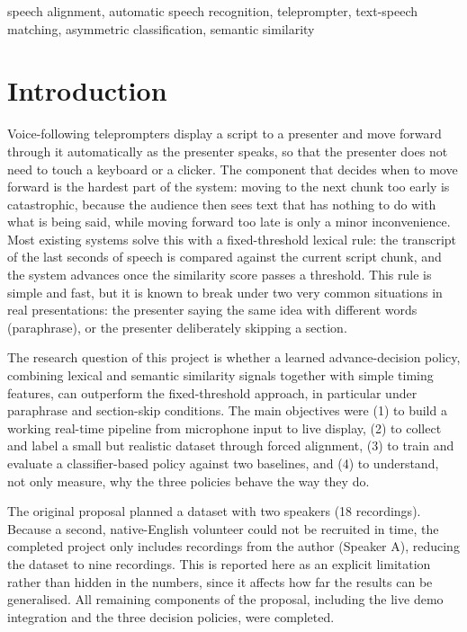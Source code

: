 \documentclass[conference,a4paper]{IEEEtran}
\begin{document}
\begin{IEEEkeywords}
speech alignment, automatic speech recognition, teleprompter, text-speech matching, asymmetric classification, semantic similarity
\end{IEEEkeywords}

\section{Introduction}
Voice-following teleprompters display a script to a presenter and move forward through it automatically as the presenter speaks, so that the presenter does not need to touch a keyboard or a clicker. The component that decides when to move forward is the hardest part of the system: moving to the next chunk too early is catastrophic, because the audience then sees text that has nothing to do with what is being said, while moving forward too late is only a minor inconvenience. Most existing systems solve this with a fixed-threshold lexical rule: the transcript of the last seconds of speech is compared against the current script chunk, and the system advances once the similarity score passes a threshold. This rule is simple and fast, but it is known to break under two very common situations in real presentations: the presenter saying the same idea with different words (paraphrase), or the presenter deliberately skipping a section.

The research question of this project is whether a learned advance-decision policy, combining lexical and semantic similarity signals together with simple timing features, can outperform the fixed-threshold approach, in particular under paraphrase and section-skip conditions. The main objectives were (1) to build a working real-time pipeline from microphone input to live display, (2) to collect and label a small but realistic dataset through forced alignment, (3) to train and evaluate a classifier-based policy against two baselines, and (4) to understand, not only measure, why the three policies behave the way they do.

The original proposal planned a dataset with two speakers (18 recordings). Because a second, native-English volunteer could not be recruited in time, the completed project only includes recordings from the author (Speaker A), reducing the dataset to nine recordings. This is reported here as an explicit limitation rather than hidden in the numbers, since it affects how far the results can be generalised. All remaining components of the proposal, including the live demo integration and the three decision policies, were completed.
\end{document}
